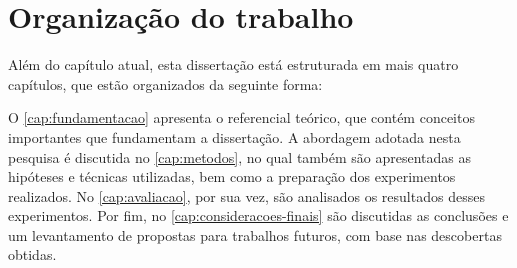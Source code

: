 \section{Organização do trabalho}
\label{sec:introducao-organizacao-trabalho}

Além do capítulo atual, esta dissertação está estruturada em mais quatro capítulos, que estão organizados da seguinte forma:

O \autoref{cap:fundamentacao} apresenta o referencial teórico, que contém conceitos importantes que fundamentam a dissertação.
A abordagem adotada nesta pesquisa é discutida no \autoref{cap:metodos}, no qual também são apresentadas as hipóteses e técnicas utilizadas, bem como a preparação dos experimentos realizados.
No \autoref{cap:avaliacao}, por sua vez, são analisados os resultados desses experimentos.
Por fim, no \autoref{cap:consideracoes-finais} são discutidas as conclusões e um levantamento de propostas para trabalhos futuros, com base nas descobertas obtidas.
